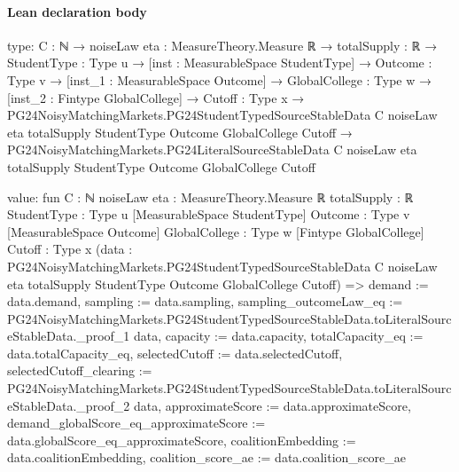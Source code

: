 \documentclass[10pt]{article}
\begin{document}
\paragraph{Lean declaration body}
\begin{ReviewVerbatim}
type:
{C : ℕ} →
  {noiseLaw eta : MeasureTheory.Measure ℝ} →
    {totalSupply : ℝ} →
      {StudentType : Type u} →
        [inst : MeasurableSpace StudentType] →
          {Outcome : Type v} →
            [inst_1 : MeasurableSpace Outcome] →
              {GlobalCollege : Type w} →
                [inst_2 : Fintype GlobalCollege] →
                  {Cutoff : Type x} →
                    PG24NoisyMatchingMarkets.PG24StudentTypedSourceStableData C noiseLaw eta totalSupply StudentType
                        Outcome GlobalCollege Cutoff →
                      PG24NoisyMatchingMarkets.PG24LiteralSourceStableData C noiseLaw eta totalSupply StudentType
                        Outcome GlobalCollege Cutoff

value:
fun {C : ℕ} {noiseLaw eta : MeasureTheory.Measure ℝ} {totalSupply : ℝ} {StudentType : Type u}
    [MeasurableSpace StudentType] {Outcome : Type v} [MeasurableSpace Outcome] {GlobalCollege : Type w}
    [Fintype GlobalCollege] {Cutoff : Type x}
    (data :
      PG24NoisyMatchingMarkets.PG24StudentTypedSourceStableData C noiseLaw eta totalSupply StudentType Outcome
        GlobalCollege Cutoff) =>
  { demand := data.demand, sampling := data.sampling,
    sampling_outcomeLaw_eq :=
      PG24NoisyMatchingMarkets.PG24StudentTypedSourceStableData.toLiteralSourceStableData._proof_1 data,
    capacity := data.capacity, totalCapacity_eq := data.totalCapacity_eq, selectedCutoff := data.selectedCutoff,
    selectedCutoff_clearing :=
      PG24NoisyMatchingMarkets.PG24StudentTypedSourceStableData.toLiteralSourceStableData._proof_2 data,
    approximateScore := data.approximateScore,
    demand_globalScore_eq_approximateScore := data.globalScore_eq_approximateScore,
    coalitionEmbedding := data.coalitionEmbedding, coalition_score_ae := data.coalition_score_ae }
\end{ReviewVerbatim}
\end{document}
